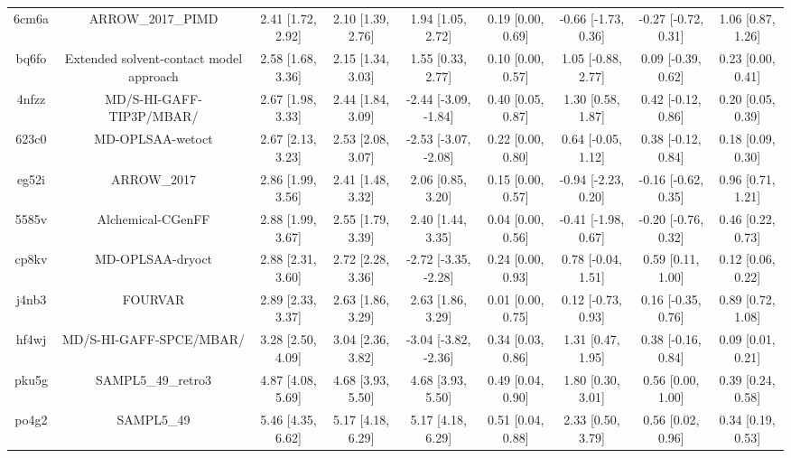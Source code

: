 \documentclass{article}
\begin{document}
\begin{center}
\begin{longtable}{|ccccccccc|}
 6cm6a &                                  ARROW\_2017\_PIMD &  2.41 [1.72, 2.92] &  2.10 [1.39, 2.76] &     1.94 [1.05, 2.72] &  0.19 [0.00, 0.69] &  -0.66 [-1.73, 0.36] &  -0.27 [-0.72, 0.31] &     1.06 [0.87, 1.26] \\
 bq6fo &            Extended solvent-contact model approach &  2.58 [1.68, 3.36] &  2.15 [1.34, 3.03] &     1.55 [0.33, 2.77] &  0.10 [0.00, 0.57] &   1.05 [-0.88, 2.77] &   0.09 [-0.39, 0.62] &     0.23 [0.00, 0.41] \\
 4nfzz &                           MD/S-HI-GAFF-TIP3P/MBAR/ &  2.67 [1.98, 3.33] &  2.44 [1.84, 3.09] &  -2.44 [-3.09, -1.84] &  0.40 [0.05, 0.87] &    1.30 [0.58, 1.87] &   0.42 [-0.12, 0.86] &     0.20 [0.05, 0.39] \\
 623c0 &                                   MD-OPLSAA-wetoct &  2.67 [2.13, 3.23] &  2.53 [2.08, 3.07] &  -2.53 [-3.07, -2.08] &  0.22 [0.00, 0.80] &   0.64 [-0.05, 1.12] &   0.38 [-0.12, 0.84] &     0.18 [0.09, 0.30] \\
 eg52i &                                        ARROW\_2017 &  2.86 [1.99, 3.56] &  2.41 [1.48, 3.32] &     2.06 [0.85, 3.20] &  0.15 [0.00, 0.57] &  -0.94 [-2.23, 0.20] &  -0.16 [-0.62, 0.35] &     0.96 [0.71, 1.21] \\
 5585v &                                  Alchemical-CGenFF &  2.88 [1.99, 3.67] &  2.55 [1.79, 3.39] &     2.40 [1.44, 3.35] &  0.04 [0.00, 0.56] &  -0.41 [-1.98, 0.67] &  -0.20 [-0.76, 0.32] &     0.46 [0.22, 0.73] \\
 cp8kv &                                   MD-OPLSAA-dryoct &  2.88 [2.31, 3.60] &  2.72 [2.28, 3.36] &  -2.72 [-3.35, -2.28] &  0.24 [0.00, 0.93] &   0.78 [-0.04, 1.51] &    0.59 [0.11, 1.00] &     0.12 [0.06, 0.22] \\
 j4nb3 &                                            FOURVAR &  2.89 [2.33, 3.37] &  2.63 [1.86, 3.29] &     2.63 [1.86, 3.29] &  0.01 [0.00, 0.75] &   0.12 [-0.73, 0.93] &   0.16 [-0.35, 0.76] &     0.89 [0.72, 1.08] \\
 hf4wj &                            MD/S-HI-GAFF-SPCE/MBAR/ &  3.28 [2.50, 4.09] &  3.04 [2.36, 3.82] &  -3.04 [-3.82, -2.36] &  0.34 [0.03, 0.86] &    1.31 [0.47, 1.95] &   0.38 [-0.16, 0.84] &     0.09 [0.01, 0.21] \\
 pku5g &                                 SAMPL5\_49\_retro3 &  4.87 [4.08, 5.69] &  4.68 [3.93, 5.50] &     4.68 [3.93, 5.50] &  0.49 [0.04, 0.90] &    1.80 [0.30, 3.01] &    0.56 [0.00, 1.00] &     0.39 [0.24, 0.58] \\
 po4g2 &                                         SAMPL5\_49 &  5.46 [4.35, 6.62] &  5.17 [4.18, 6.29] &     5.17 [4.18, 6.29] &  0.51 [0.04, 0.88] &    2.33 [0.50, 3.79] &    0.56 [0.02, 0.96] &     0.34 [0.19, 0.53] \\
\end{longtable}
\end{center}
\end{document}
